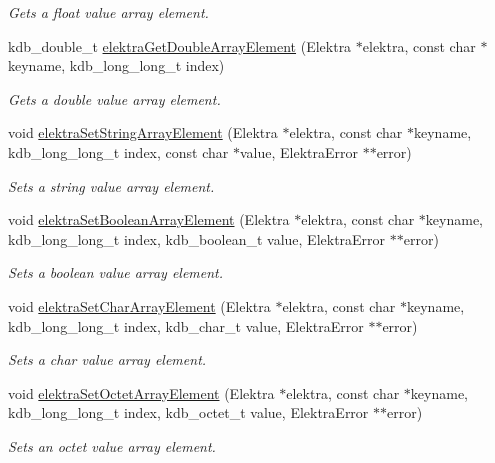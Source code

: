 \begin{DoxyCompactItemize}
\begin{DoxyCompactList}\small\item\em Gets a float value array element. \end{DoxyCompactList}\item 
kdb\+\_\+double\+\_\+t \hyperlink{group__highlevel_ga838e146de1cf41ecd2795654f3d7b4a8}{elektra\+Get\+Double\+Array\+Element} (Elektra $\ast$elektra, const char $\ast$keyname, kdb\+\_\+long\+\_\+long\+\_\+t index)
\begin{DoxyCompactList}\small\item\em Gets a double value array element. \end{DoxyCompactList}\item 
void \hyperlink{group__highlevel_gaa5bba7a5c811437562d947420034fd03}{elektra\+Set\+String\+Array\+Element} (Elektra $\ast$elektra, const char $\ast$keyname, kdb\+\_\+long\+\_\+long\+\_\+t index, const char $\ast$value, Elektra\+Error $\ast$$\ast$error)
\begin{DoxyCompactList}\small\item\em Sets a string value array element. \end{DoxyCompactList}\item 
void \hyperlink{group__highlevel_gafdd7472c0e2ae89c695658a92a9705e7}{elektra\+Set\+Boolean\+Array\+Element} (Elektra $\ast$elektra, const char $\ast$keyname, kdb\+\_\+long\+\_\+long\+\_\+t index, kdb\+\_\+boolean\+\_\+t value, Elektra\+Error $\ast$$\ast$error)
\begin{DoxyCompactList}\small\item\em Sets a boolean value array element. \end{DoxyCompactList}\item 
void \hyperlink{group__highlevel_ga7417026ccad027e05404bfeec659e11b}{elektra\+Set\+Char\+Array\+Element} (Elektra $\ast$elektra, const char $\ast$keyname, kdb\+\_\+long\+\_\+long\+\_\+t index, kdb\+\_\+char\+\_\+t value, Elektra\+Error $\ast$$\ast$error)
\begin{DoxyCompactList}\small\item\em Sets a char value array element. \end{DoxyCompactList}\item 
void \hyperlink{group__highlevel_ga2019d4db326a9beb36d2c60e351f5e9e}{elektra\+Set\+Octet\+Array\+Element} (Elektra $\ast$elektra, const char $\ast$keyname, kdb\+\_\+long\+\_\+long\+\_\+t index, kdb\+\_\+octet\+\_\+t value, Elektra\+Error $\ast$$\ast$error)
\begin{DoxyCompactList}\small\item\em Sets an octet value array element. \end{DoxyCompactList}\item 

\end{DoxyCompactItemize}

